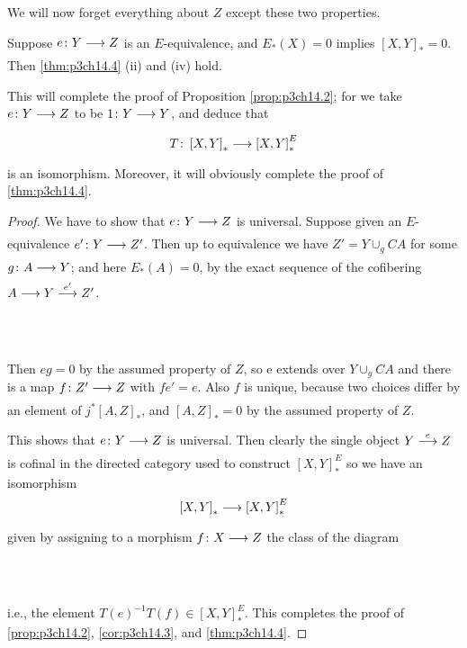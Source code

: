 \documentclass[../main]{subfiles}
\begin{document}
We will now forget everything about $Z$ except these two properties.
\begin{lemma} \label{lem:p3ch14.11}
Suppose $e\colon  Y \lar{}  Z $ is an $E$-equivalence, and  $E_{\ast}(X)=0$ implies $ \left[X,Y\right]_{\ast}=0$. Then \ref{thm:p3ch14.4} (ii) and (iv) hold. 

This will complete the proof of Proposition \ref{prop:p3ch14.2}; for we take $e\colon  Y \lar{}  Z $ to be  $1\colon  Y \lar{}  Y $, and deduce that 
\[
  T\colon  \left[X,Y\right]_{\ast} \lar{} \left[X,Y\right]^E_{\ast}  
\] 
is an isomorphism. Moreover, it will obviously complete the proof of \ref{thm:p3ch14.4}. 
\begin{proof} 
    We have to show that $e\colon  Y \lar{}  Z $ is universal. Suppose given an $E$-equivalence $e'\colon  Y \lar{}  Z' $. Then up to equivalence we have $Z'= Y \displaystyle{\cup_{g}} CA $ for some $g\colon  A \lar{}  Y $; and here $E_{\ast}(A)=0$, by the exact sequence of the cofibering $A \lar{} Y \vra{e'} Z'$.
    ~\\~\\
    ~\\~\\
 Then $eg = 0$ by the assumed property of $Z$, so e extends over $Y \displaystyle{\cup_{g}}  CA$ and there is a map $f\colon  Z' \lar{}  Z $ with $fe'=e$. Also $f$ is unique, because two choices differ by an element of $j^\ast\left[A,Z\right]_{\ast}$, and $ \left[A,Z\right]_{\ast}=0$ by the assumed property of $Z$.   

This shows that $e\colon  Y \lar{}  Z $ is universal. Then clearly the single object $Y\vra{e} Z$ is cofinal in the directed category used to construct $ \left[X,Y\right]^E_{\ast}$ so we have an isomorphism
\[
  \left[X,Y\right]_\ast \lar{} \left[X,Y\right]^E_{\ast} 
\] 
given by assigning to a morphism $f\colon  X \lar{}  Z $ the class of the diagram
~\\~\\
~\\~\\
i.e., the element $T(e)^{-1}T(f) \in \left[X,Y\right]^E_{\ast}$. This completes the proof of \ref{prop:p3ch14.2}, \ref{cor:p3ch14.3}, and \ref{thm:p3ch14.4}.
\end{proof}
\end{lemma}
\end{document}
